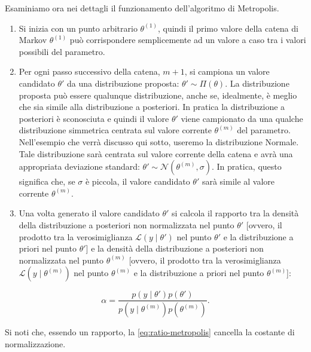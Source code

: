 \documentclass[
]{memoir}
\begin{document}
Esaminiamo ora nei dettagli il funzionamento dell'algoritmo di Metropolis.

\begin{enumerate}
\def\labelenumi{(\alph{enumi})}
\item
  Si inizia con un punto arbitrario \(\theta^{(1)}\), quindi il primo valore della catena di Markov \(\theta^{(1)}\) può corrispondere semplicemente ad un valore a caso tra i valori possibili del parametro.
\item
  Per ogni passo successivo della catena, \(m + 1\), si campiona un valore candidato \(\theta'\) da una distribuzione proposta: \(\theta' \sim \Pi(\theta)\). La distribuzione proposta può essere qualunque distribuzione, anche se, idealmente, è meglio che sia simile alla distribuzione a posteriori. In pratica la distribuzione a posteriori è sconosciuta e quindi il valore \(\theta'\) viene campionato da una qualche distribuzione simmetrica centrata sul valore corrente \(\theta^{(m)}\) del parametro. Nell'esempio che verrà discusso qui sotto, useremo la distribuzione Normale. Tale distribuzione sarà centrata sul valore corrente della catena e avrà una appropriata deviazione standard: \(\theta' \sim \mathcal{N}(\theta^{(m)}, \sigma)\). In pratica, questo significa che, se \(\sigma\) è piccola, il valore candidato \(\theta'\) sarà simile al valore corrente \(\theta^{(m)}\).
\item
  Una volta generato il valore candidato \(\theta'\) si calcola il rapporto tra la densità della distribuzione a posteriori non normalizzata nel punto \(\theta'\) {[}ovvero, il prodotto tra la verosimiglianza \(\mathcal{L}(y \mid \theta')\) nel punto \(\theta'\) e la distribuzione a priori nel punto \(\theta'\){]} e la densità della distribuzione a posteriori non normalizzata nel punto \(\theta^{(m)}\) {[}ovvero, il prodotto tra la verosimiglianza \(\mathcal{L}(y \mid \theta^{(m)})\) nel punto \(\theta^{(m)}\) e la distribuzione a priori nel punto \(\theta^{(m)}\){]}:
\end{enumerate}

\begin{equation}
\alpha = \frac{p(y \mid \theta') p(\theta')}{p(y \mid \theta^{(m)}) p(\theta^{(m)})}.
\label{eq:ratio-metropolis}
\end{equation}

\noindent
Si noti che, essendo un rapporto, la \eqref{eq:ratio-metropolis} cancella la costante di normalizzazione.
\end{document}
